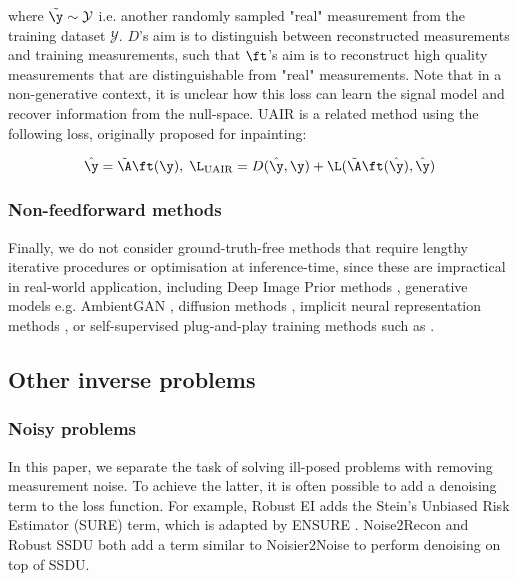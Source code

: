 where $\tilde\y\sim\mathcal{Y}$ i.e. another randomly sampled "real" measurement from the training dataset $\mathcal{Y}$. $D$'s aim is to distinguish between reconstructed measurements and training measurements, such that $\ft$'s aim is to reconstruct high quality measurements that are distinguishable from "real" measurements. Note that in a non-generative context, it is unclear how this loss can learn the signal model and recover information from the null-space. UAIR \cite{pajot_unsupervised_2018} is a related method using the following loss, originally proposed for inpainting:

\begin{equation}
    \hat\y=\tilde\A \ft(\y),\;\L_\text{UAIR}=D(\hat\y,\y)+\L(\tilde\A\ft(\hat\y),\hat\y)
    \label{eq:uair}    
\end{equation}

\subsubsection{Non-feedforward methods}

Finally, we do not consider ground-truth-free methods that require lengthy iterative procedures or optimisation at inference-time, since these are impractical in real-world application, including Deep Image Prior methods \cite{darestani_accelerated_2021}, generative models e.g. AmbientGAN \cite{bora_ambientgan_2018}, diffusion methods \cite{daras_ambient_2023,kawar_gsure-based_2024,aali_ambient_2024}, implicit neural representation methods \cite{shen_nerp_2024}, or self-supervised plug-and-play training methods such as \cite{shafique_mri_2024}.

\subsection{Other inverse problems}
\label{sec:other_problems}
\subsubsection{Noisy problems}
\label{sec:noisy_problems}

In this paper, we separate the task of solving ill-posed problems with removing measurement noise. To achieve the latter, it is often possible to add a denoising term to the loss function. For example, Robust EI \cite{chen_robust_2022} adds the Stein's Unbiased Risk Estimator (SURE) term, which is adapted by ENSURE \cite{aggarwal_ensure_2023}. Noise2Recon \cite{desai_noise2recon_2022} and Robust SSDU \cite{millard_clean_2024} both add a term similar to Noisier2Noise \cite{moran_noisier2noise_2019} to perform denoising on top of SSDU.

